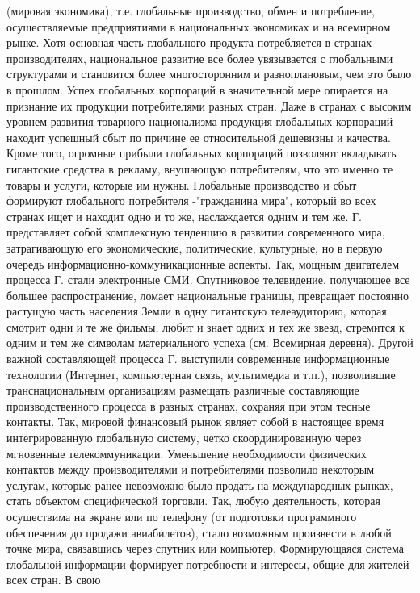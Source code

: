 \documentclass[12pt]{article}
\begin{document}
(мировая экономика), т.е. глобальные производство, обмен и потребление, осуществляемые предприятиями в
национальных экономиках и на всемирном рынке. Хотя основная часть глобального продукта потребляется в
странах-производителях,  национальное  развитие  все  более  увязывается  с  глобальными  структурами  и
становится более многосторонним и разноплановым, чем это было в прошлом. Успех глобальных корпораций в
значительной мере опирается на признание их продукции потребителями разных стран. Даже в странах с
высоким  уровнем  развития товарного национализма продукция  глобальных корпораций  находит  успешный
сбыт  по  причине  ее  относительной  дешевизны  и  качества.  Кроме  того,  огромные  прибыли  глобальных
корпораций позволяют вкладывать гигантские средства в рекламу, внушающую потребителям, что это именно
те товары и услуги, которые им нужны. Глобальные производство и сбыт формируют глобального потребителя -"гражданина мира", который во всех странах ищет и находит одно и то же, наслаждается одним и тем же. Г.
представляет  собой  комплексную  тенденцию  в  развитии  современного  мира,  затрагивающую  его
экономические, политические, культурные, но в первую очередь информационно-коммуникационные аспекты.
Так, мощным двигателем процесса Г. стали электронные СМИ. Спутниковое телевидение, получающее все
большее распространение, ломает национальные границы, превращает постоянно растущую часть населения
Земли в одну гигантскую телеаудиторию, которая смотрит одни и те же фильмы, любит и знает одних и тех же
звезд, стремится к одним и тем же символам материального успеха (см. Всемирная деревня). Другой важной
составляющей  процесса  Г.  выступили  современные  информационные  технологии  (Интернет,  компьютерная
связь,  мультимедиа  и  т.п.),  позволившие  транснациональным  организациям  размещать  различные 
составляющие  производственного  процесса  в  разных  странах,  сохраняя  при  этом  тесные  контакты.  Так,
мировой финансовый рынок являет собой в настоящее время интегрированную глобальную систему, четко
скоординированную через мгновенные телекоммуникации. Уменьшение необходимости физических контактов
между  производителями  и  потребителями  позволило  некоторым  услугам,  которые  ранее  невозможно  было
продать на международных рынках, стать объектом специфической торговли. Так, любую деятельность, которая
осуществима на экране или по телефону (от подготовки программного обеспечения до продажи авиабилетов),
стало возможным произвести в любой точке мира, связавшись через спутник или компьютер. Формирующаяся
система глобальной информации формирует потребности и интересы, общие для жителей всех стран. В свою
\end{document}
